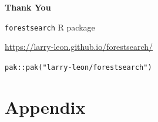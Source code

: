 \documentclass[
  11pt,
  ignorenonframetext,
  aspectratio=169,
]{beamer}
\begin{document}
\begin{frame}[plain]{}
\label{section}
\vfill
\begin{center}
{\Large\bfseries\color{UBCblue} Thank You}

\bigskip

{\large \texttt{forestsearch} R package}

\medskip

\url{https://larry-leon.github.io/forestsearch/}

\medskip

\texttt{pak::pak("larry-leon/forestsearch")}
\end{center}
\vfill
\end{frame}

\section*{Appendix}\label{appendix}
\end{document}

